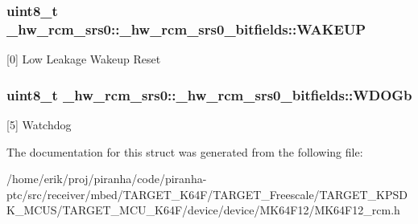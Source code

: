 \subsubsection[{\texorpdfstring{W\+A\+K\+E\+UP}{WAKEUP}}]{\setlength{\rightskip}{0pt plus 5cm}uint8\+\_\+t \+\_\+hw\+\_\+rcm\+\_\+srs0\+::\+\_\+hw\+\_\+rcm\+\_\+srs0\+\_\+bitfields\+::\+W\+A\+K\+E\+UP}\hypertarget{struct__hw__rcm__srs0_1_1__hw__rcm__srs0__bitfields_a860e9b1835621cc57906535ba4a90b5d}{}\label{struct__hw__rcm__srs0_1_1__hw__rcm__srs0__bitfields_a860e9b1835621cc57906535ba4a90b5d}
\mbox{[}0\mbox{]} Low Leakage Wakeup Reset 
\subsubsection[{\texorpdfstring{W\+D\+O\+Gb}{WDOGb}}]{\setlength{\rightskip}{0pt plus 5cm}uint8\+\_\+t \+\_\+hw\+\_\+rcm\+\_\+srs0\+::\+\_\+hw\+\_\+rcm\+\_\+srs0\+\_\+bitfields\+::\+W\+D\+O\+Gb}\hypertarget{struct__hw__rcm__srs0_1_1__hw__rcm__srs0__bitfields_ae941e40f1f18a62db47d62112196d8e6}{}\label{struct__hw__rcm__srs0_1_1__hw__rcm__srs0__bitfields_ae941e40f1f18a62db47d62112196d8e6}
\mbox{[}5\mbox{]} Watchdog 

The documentation for this struct was generated from the following file\+:\begin{DoxyCompactItemize}
\item 
/home/erik/proj/piranha/code/piranha-\/ptc/src/receiver/mbed/\+T\+A\+R\+G\+E\+T\+\_\+\+K64\+F/\+T\+A\+R\+G\+E\+T\+\_\+\+Freescale/\+T\+A\+R\+G\+E\+T\+\_\+\+K\+P\+S\+D\+K\+\_\+\+M\+C\+U\+S/\+T\+A\+R\+G\+E\+T\+\_\+\+M\+C\+U\+\_\+\+K64\+F/device/device/\+M\+K64\+F12/M\+K64\+F12\+\_\+rcm.\+h\end{DoxyCompactItemize}
